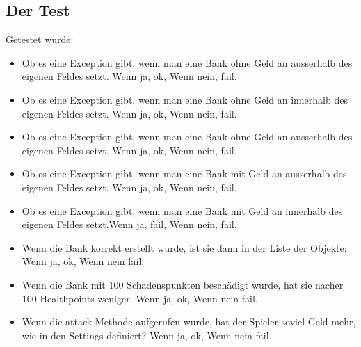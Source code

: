 \documentclass[ngerman, 12pt, pdftex]{scrartcl}[2006/07/30]
\begin{document}
\subsection{Der Test}
Getestet wurde:
\begin{itemize}
\item Ob es eine Exception gibt, wenn man eine Bank ohne Geld an ausserhalb des eigenen Feldes setzt. Wenn ja, ok, Wenn nein, fail.
\item Ob es eine Exception gibt, wenn man eine Bank ohne Geld an innerhalb des eigenen Feldes setzt. Wenn ja, ok, Wenn nein, fail.
\item Ob es eine Exception gibt, wenn man eine Bank ohne Geld an ausserhalb des eigenen Feldes setzt. Wenn ja, ok, Wenn nein, fail.
\item Ob es eine Exception gibt, wenn man eine Bank mit Geld an ausserhalb des eigenen Feldes setzt. Wenn ja, ok, Wenn nein, fail.
\item Ob es eine Exception gibt, wenn man eine Bank mit Geld an innerhalb des eigenen Feldes setzt.Wenn ja, fail, Wenn nein, fail.
\item Wenn die Bank korrekt erstellt wurde, ist sie dann in der Liste der Objekte: Wenn ja, ok, Wenn nein fail.
\item Wenn die Bank mit 100 Schadenspunkten besch\"{a}digt wurde, hat sie nacher 100 Healthpoints weniger. Wenn ja, ok, Wenn nein fail.
\item Wenn die attack Methode aufgerufen wurde, hat der Spieler soviel Geld mehr, wie in den Settings definiert? Wenn ja, ok, Wenn nein fail.
\end{itemize}

 
\end{document}
